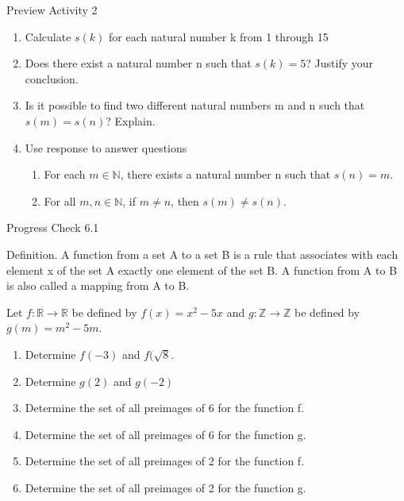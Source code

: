 \documentclass{beamer}
\newcounter{saveenumi}
\newcommand{\conti}{\setcounter{enumi}{\value{saveenumi}}}
\begin{document}
\begin{frame}{Preview Activity 2}
    \begin{enumerate}
        \conti
        \item Calculate $s(k)$ for each natural number k from 1 through 15
        \item Does there exist a natural number n such that $s(k) = 5$? Justify your conclusion.
        \item Is it possible to find two different natural numbers m and n such that $s(m) = s(n)$? Explain.
        \item Use response to answer questions
        \begin{enumerate}
            \item For each $m \in \mathbb{N}$, there exists a natural number n such that $s(n) = m$.
            \item For all $m,n \in \mathbb{N}$, if $m \neq n$, then $s(m) \neq s(n)$.
        \end{enumerate}
    \end{enumerate}
\end{frame}

\begin{frame}{Progress Check 6.1}
    \begin{definition}
    Definition. A function from a set A to a set B is a rule that associates with
each element x of the set A exactly one element of the set B. A function from
A to B is also called a mapping from A to B.
    \end{definition}
    
     Let $f : \mathbb{R} \to \mathbb{R}$ be defined by $f(x) = x^2 - 5x$ and $g : \mathbb{Z} \to \mathbb{Z}$ be defined by $g(m) = m^2 - 5m$.
     \begin{enumerate}
         \item Determine $f(-3)$ and $f(\sqrt{8}$.
         \item Determine $g(2)$ and $g(-2)$
         \item Determine the set of all preimages of 6 for the function f.
        \item Determine the set of all preimages of 6 for the function g.
        \item Determine the set of all preimages of 2 for the function f.
        \item Determine the set of all preimages of 2 for the function g.
     \end{enumerate}    
\end{frame}
\end{document}
